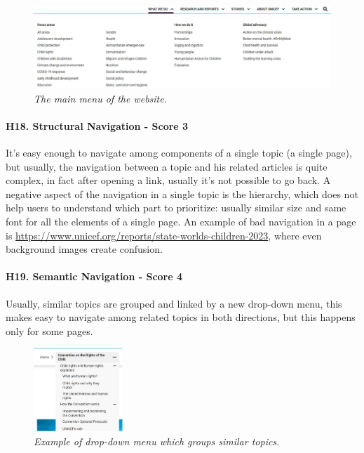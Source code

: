 \begin{figure}[!h]
	\begin{center}
		\includegraphics[width=\textwidth]{FinalScores20.jpg}
		\captionsetup{font=small}
		\caption{\textit{The main menu of the website.}}
	\end{center}
\end{figure}
\newline
\newline \paragraph{H18. Structural Navigation - Score 3}  \label{subsec:H18}	It’s easy enough to navigate among components of a single topic (a single page), but usually, the navigation between a topic and his related articles is quite complex, in fact after opening a link, usually it’s not possible to go back.
\newline A negative aspect of the navigation in a single topic is the hierarchy, which does not help users to understand which part to prioritize: usually similar size and same font for all the elements of a single page.
\newline An example of bad navigation in a page is \href{https://www.unicef.org/reports/state-worlds-children-2023}{https://www.unicef.org/reports/state-worlds-children-2023}, where even background images create confusion.
\newline
\newline \paragraph{H19. Semantic Navigation - Score 4}  \label{subsec:H19}	Usually, similar topics are grouped and linked by a new drop-down menu, this makes easy to navigate among related topics in both directions, but this happens only for some pages.
\begin{figure}[!h]
	\begin{center}
		\includegraphics[width=0.3\textwidth]{FinalScores21.jpg}
		\captionsetup{font=small}
		\caption{\textit{Example of drop-down menu which groups similar topics.}}
	\end{center}
\end{figure}
